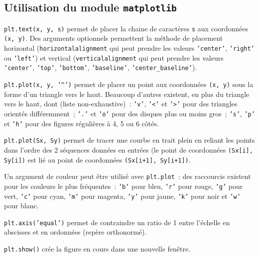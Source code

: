 \subsection*{Utilisation du module \texttt{matplotlib}}

\texttt{plt.text(x, y, s)} permet de placer la chaine de caractères \texttt{s} aux coordonnées \texttt{(x, y)}. Des arguments optionnels permettent la méthode de placement horizontal (\texttt{horizontalalignment} qui peut prendre les valeurs \texttt{'center'}, \texttt{'right'} ou \texttt{'left'}) et vertical (\texttt{verticalalignment} qui peut prendre les valeurs \texttt{'center'}, \texttt{'top'}, \texttt{'bottom'}, \texttt{'baseline'}, \texttt{'center\_baseline'}).

\texttt{plt.plot(x, y, '\textasciicircum')} permet de placer un point aux coordonnées \texttt{(x, y)} sous la forme d'un triangle vers le haut. Beaucoup d'autres existent, en plus du triangle vers le haut, dont (liste non-exhaustive)~: \texttt{'v'}, \texttt{'<'} et \texttt{'>'} pour des triangles orientés différemment~; \texttt{'.'} et \texttt{'o'} pour des disques plus ou moins gros~; \texttt{'s'}, \texttt{'p'} et \texttt{'h'} pour des figures régulières à 4, 5 ou 6 côtés. 

\texttt{plt.plot(Sx, Sy)} permet de tracer une courbe en trait plein en reliant les points dans l'ordre des 2 séquences données en entrées (le point de coordonnées \texttt{(Sx[i], Sy[i])} est lié au point de coordonnées \texttt{(Sx[i+1], Sy[i+1])}.

Un argument de couleur peut être utilisé avec \texttt{plt.plot}~: des raccourcis existent pour les couleurs le plus fréquentes~: \texttt{'b'} pour bleu, \texttt{'r'} pour rouge, \texttt{'g'} pour vert, \texttt{'c'} pour cyan, \texttt{'m'} pour magenta, \texttt{'y'} pour jaune, \texttt{'k'} pour noir et \texttt{'w'} pour blanc. 

\texttt{plt.axis('equal')} permet de contraindre un ratio de 1 entre l'échelle en abscisses et en ordonnées (repère orthonormé).

\texttt{plt.show()} crée la figure en cours dans une nouvelle fenêtre. 
 







